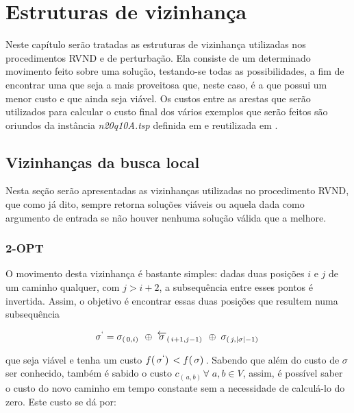 \chapter{Estruturas de vizinhança}\label{chp:LABEL_CHP_5}

\par Neste capítulo serão tratadas as estruturas de vizinhança utilizadas nos procedimentos RVND e de perturbação. Ela consiste de um determinado movimento feito sobre uma solução, testando-se todas as possibilidades, a fim de encontrar uma que seja a mais proveitosa que, neste caso, é a que possui um menor custo e que ainda seja viável. Os custos entre as arestas que serão utilizados para calcular o custo final dos vários exemplos que serão feitos são oriundos da instância \textit{n20q10A.tsp} definida em \citep{art:REF_ART_3} e reutilizada em \citep{art:REF_ART_5}.

\section{Vizinhanças da busca local}\label{sec:LABEL_CHP_5_SEC_A}

\par Nesta seção serão apresentadas as vizinhanças utilizadas no procedimento RVND, que como já dito, sempre retorna soluções viáveis ou aquela dada como argumento de entrada se não houver nenhuma solução válida que a melhore.

\subsection{2-OPT}\label{sec:LABEL_CHP_5_SUBSEC_A}

\par O movimento desta vizinhança é bastante simples: dadas duas posições $i$ e $j$ de um caminho qualquer, com $j > i + 2$, a subsequência entre esses pontos é invertida. Assim, o objetivo é encontrar essas duas posições que resultem numa subsequência 
    
    \begin{gather}
        \sigma^\lq = \sigma_{(\,0, i)\,}\; \oplus\; \overleftarrow{\sigma}_{(\,i+1, j-1)\,}\; \oplus\; \sigma_{(\,j, |\sigma|-1)\,}
    \end{gather}
    
que seja viável e tenha um custo $f(\,\sigma^\lq)\, < f(\,\sigma)\,$. Sabendo que além do custo de $\sigma$ ser conhecido, também é sabido o custo $c_{(\,a, b)\,} \forall\; a, b \in V$, assim, é possível saber o custo do novo caminho em tempo constante sem a necessidade de calculá-lo do zero. Este custo se dá por:

